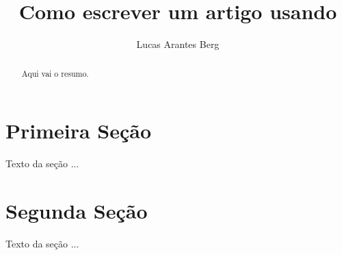 \documentclass[]{article}
\title{Como escrever um artigo usando \Latex}
\author{Lucas Arantes Berg}
\begin{document}
	
	\maketitle
	
	\begin{abstract}
		Aqui vai o resumo.
	\end{abstract}
	
	\section{Primeira Seção}
	Texto da seção ...
	
	\section{Segunda Seção}
	Texto da seção ...
		
\end{document}
